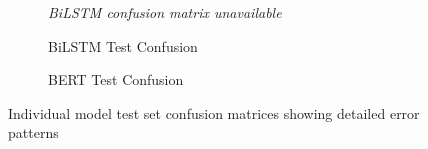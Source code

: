 \documentclass[conference]{IEEEtran}
\begin{document}
\begin{figure}[H]
\begin{subfigure}{0.32\linewidth}
{        }{%
            \textit{BiLSTM confusion matrix unavailable}
        }
        \caption{BiLSTM Test Confusion}
    \end{subfigure}
    \hfill
    \begin{subfigure}{0.32\linewidth}
        \centering
        \caption{BERT Test Confusion}
    \end{subfigure}
    \caption{Individual model test set confusion matrices showing detailed error patterns}
    \label{fig:individual_confusion}
\end{figure}
\end{document}

